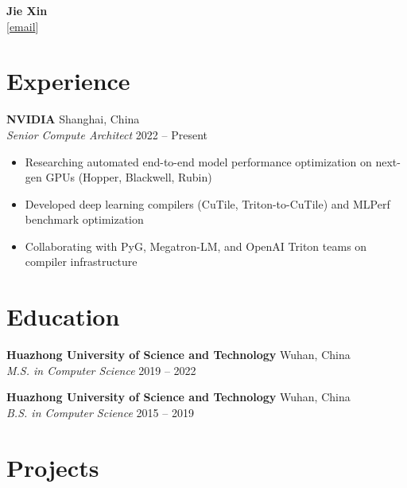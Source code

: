 \documentclass[11pt,a4paper]{article}
\begin{document}
\begin{center}
    {\Huge\bfseries Jie Xin} \\[8pt]
    [\href{mailto:cs.xinjie@gmail.com}{email}]  
\end{center}

\vspace{2pt}

\section{Experience}

\noindent\textbf{NVIDIA} \hfill Shanghai, China \\
\textit{Senior Compute Architect} \hfill 2022 -- Present
\begin{itemize}
    \item Researching automated end-to-end model performance optimization on next-gen GPUs (Hopper, Blackwell, Rubin)
    \item Developed deep learning compilers (CuTile, Triton-to-CuTile) and MLPerf benchmark optimization
    \item Collaborating with PyG, Megatron-LM, and OpenAI Triton teams on compiler infrastructure
\end{itemize}

\vspace{4pt}

\section{Education}

\noindent\textbf{Huazhong University of Science and Technology} \hfill Wuhan, China \\
\textit{M.S. in Computer Science} \hfill 2019 -- 2022

\vspace{6pt}

\noindent\textbf{Huazhong University of Science and Technology} \hfill Wuhan, China \\
\textit{B.S. in Computer Science} \hfill 2015 -- 2019

\vspace{4pt}

\section{Projects}
\end{document}
